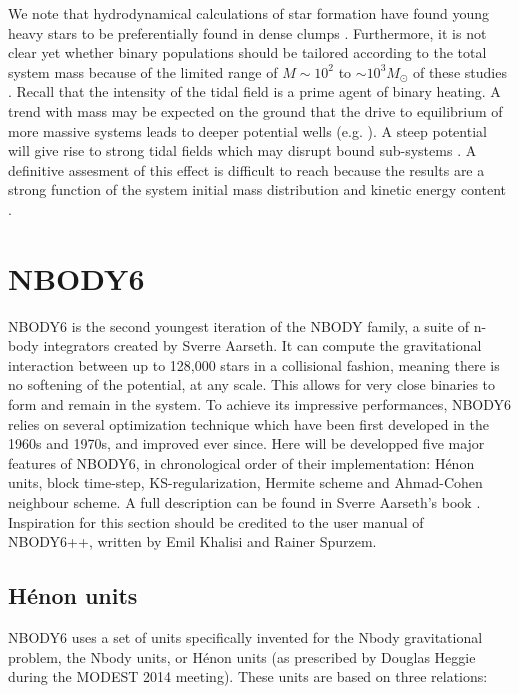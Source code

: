   We note that hydrodynamical calculations of star formation have found young heavy stars to be preferentially found in dense clumps \citep{Maschberger2010}. Furthermore, it is not clear yet whether binary populations should be tailored according to the total system mass because of the limited range of $M \sim 10^2$ to $ \sim 10^3 M_\odot$ of these studies \citep{Kroupa2001,Parker2011,Parker2014}. Recall that the intensity of the tidal field is a prime agent of binary heating.  A trend with mass may be expected on the ground that the drive to equilibrium of more massive systems leads to deeper potential wells (e.g. \citealt{Aarseth1988,Boily2002}). A steep potential will give rise to strong tidal fields which may disrupt bound sub-systems \citep{Boily2004,Renaud2011}. A definitive assesment of this effect is difficult to reach because the results are a strong function of the system initial mass distribution and kinetic energy content \citep{Boily2002,Caputo2014}.




\newpage
\section{NBODY6}


NBODY6 is the second youngest iteration of the NBODY family, a suite of n-body integrators created by Sverre Aarseth. It can compute the gravitational interaction between up to 128,000 stars in a collisional fashion, meaning there is no softening of the potential, at any scale. This allows for very close binaries to form and remain in the system. To achieve its impressive performances, NBODY6 relies on several optimization technique which have been first developed in the 1960s and 1970s, and improved ever since. Here will be developped five major features of NBODY6, in chronological order of their implementation: H\'enon units, block time-step, KS-regularization, Hermite scheme and Ahmad-Cohen neighbour scheme. A full description can be found in Sverre Aarseth's book \citep{Aarseth2003}. Inspiration for this section should be credited to the user manual of NBODY6++, written by Emil Khalisi and Rainer Spurzem.

\subsection{H\'enon units}

NBODY6 uses a set of units specifically invented for the Nbody gravitational problem, the Nbody units, or H\'enon units (as prescribed by Douglas Heggie during the MODEST 2014 meeting). These units are based on three relations:

